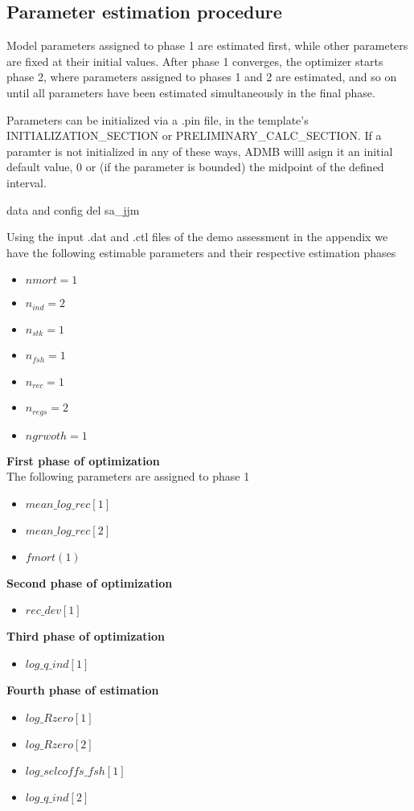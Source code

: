 \documentclass{article}
\begin{document}
\subsection{Parameter estimation procedure}
Model parameters assigned to phase 1 are estimated first, while other parameters are fixed at their initial values.  After phase 1 converges, the optimizer starts phase 2, where parameters assigned to phases 1 and  2 are estimated, and so on until all parameters have been estimated simultaneously in the final phase.

Parameters can be initialized via a .pin file, in the template's INITIALIZATION\_SECTION or PRELIMINARY\_CALC\_SECTION. If a paramter is not initialized in any of these ways, ADMB willl asign it an initial default value, 0 or (if  the  parameter is bounded) the midpoint of the defined interval. 

data and config del sa\_jjm

Using the input .dat and .ctl files of the demo assessment in the appendix we have the following estimable parameters and their respective estimation phases
\begin{itemize}
    \item $nmort=1$
    \item $n_{ind}=2$
    \item $n_{stk}=1$
    \item $n_{fsh}=1$
    \item $n_{rec}=1$
    \item $n_{regs}=2$
    \item $ngrwoth=1$
\end{itemize}
\textbf{First phase of optimization}\\
The following parameters are assigned to phase 1

\begin{itemize}
    \item $mean\_log\_rec[1]$
    \item $mean\_log\_rec[2]$
    \item $fmort(1)$
\end{itemize}

\textbf{Second phase of optimization}
\begin{itemize}
    \item $rec\_dev[1]$
\end{itemize}

\textbf{Third phase of optimization}
\begin{itemize}
    \item $log\_q\_ind[1]$
\end{itemize}
\textbf{Fourth phase of estimation}
\begin{itemize}
    \item $log\_Rzero[1]$
    \item $log\_Rzero[2]$
    \item $log\_selcoffs\_fsh[1]$
    \item $log\_q\_ind[2]$
\end{itemize}
\end{document}
